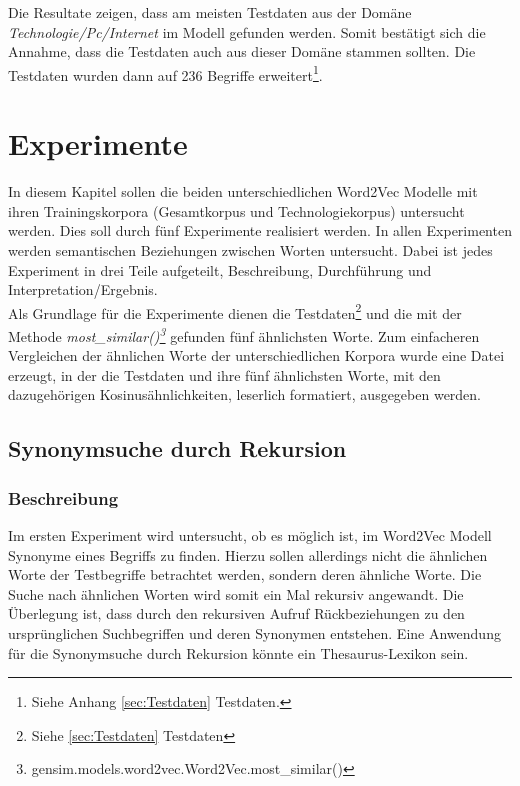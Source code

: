 \documentclass[12pt,a4paper]{report}
\begin{document}
Die Resultate zeigen, dass am meisten Testdaten aus der Domäne \textit{Technologie/Pc/Internet} im Modell gefunden werden.
Somit bestätigt sich die Annahme, dass die Testdaten auch aus dieser Domäne stammen sollten. 
Die Testdaten wurden dann auf 236 Begriffe erweitert\footnote{Siehe Anhang \ref{sec:Testdaten} Testdaten.}.
	
	
\newpage
\chapter{Experimente}
\label{chap:Experimente}
In diesem Kapitel sollen die beiden unterschiedlichen Word2Vec Modelle mit ihren Trainingskorpora (Gesamtkorpus und Technologiekorpus) untersucht werden. Dies soll durch fünf Experimente realisiert werden. In allen Experimenten werden semantischen Beziehungen zwischen Worten untersucht. Dabei ist jedes Experiment in drei Teile aufgeteilt, Beschreibung, Durchführung und Interpretation/Ergebnis.\\
Als Grundlage für die Experimente dienen die Testdaten\footnote{Siehe \ref{sec:Testdaten} Testdaten} und die mit der Methode \textit{most\_similar()\footnote{gensim.models.word2vec.Word2Vec.most\_similar()}} gefunden fünf ähnlichsten Worte. Zum einfacheren Vergleichen der ähnlichen Worte der unterschiedlichen Korpora wurde eine Datei erzeugt, in der die Testdaten und ihre fünf ähnlichsten Worte, mit den dazugehörigen Kosinusähnlichkeiten, leserlich formatiert, ausgegeben werden.\\ 

	\section{Synonymsuche durch Rekursion}
\label{chap:Experiment1}
		\subsection*{Beschreibung}
		Im ersten Experiment wird untersucht, ob es möglich ist, im Word2Vec Modell Synonyme eines Begriffs zu finden. Hierzu sollen allerdings nicht die ähnlichen Worte der Testbegriffe betrachtet werden, sondern deren ähnliche Worte. Die Suche nach ähnlichen Worten wird somit ein Mal rekursiv angewandt. Die Überlegung ist, dass durch den rekursiven Aufruf Rückbeziehungen zu den ursprünglichen Suchbegriffen und deren Synonymen entstehen. Eine Anwendung für die Synonymsuche durch Rekursion könnte ein Thesaurus-Lexikon sein.\\
		
\end{document}
